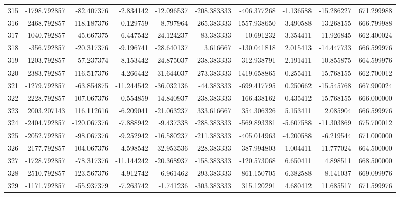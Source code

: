 \begin{tabular}{lrrrrrrrrr}
315 &  -1798.792857 &   -82.407376 &  -2.834142 & -12.096537 &  -208.383333 &  -406.377268 &  -1.136588 & -15.286227 &  671.299988 \\
316 &  -2468.792857 &  -118.187376 &   0.129759 &   8.797964 &  -265.383333 &  1557.938650 &  -3.490588 & -13.268155 &  666.799988 \\
317 &  -1040.792857 &   -45.667375 &  -6.447542 & -24.124237 &   -83.383333 &   -10.691232 &   3.354411 & -11.926845 &  662.400024 \\
318 &   -356.792857 &   -20.317376 &  -9.196741 & -28.640137 &     3.616667 &  -130.041818 &   2.015413 & -14.447733 &  666.599976 \\
319 &  -1203.792857 &   -57.237374 &  -8.153442 & -24.875037 &  -238.383333 &  -312.938791 &   2.191411 & -10.855875 &  664.599976 \\
320 &  -2383.792857 &  -116.517376 &  -4.266442 & -31.644037 &  -273.383333 &  1419.658865 &   0.255411 & -15.768155 &  662.700012 \\
321 &  -1279.792857 &   -63.854875 & -11.244542 & -36.032136 &   -44.383333 &  -699.417795 &   0.250662 & -15.545768 &  667.900024 \\
322 &  -2228.792857 &  -107.067376 &   0.554859 & -14.840937 &  -238.383333 &   166.438162 &   0.435412 & -15.768155 &  666.000000 \\
323 &   2003.207143 &   116.112616 &  -6.209041 & -21.063237 &   333.616667 &   354.306326 &   5.153411 &   2.085904 &  666.599976 \\
324 &  -2404.792857 &  -120.067376 &  -7.888942 &  -9.437338 &  -288.383333 &  -569.893381 &  -5.607588 & -11.303869 &  675.700012 \\
325 &  -2052.792857 &   -98.067376 &  -9.252942 & -16.580237 &  -211.383333 &  -405.014963 &  -4.200588 &  -6.219544 &  671.000000 \\
326 &  -2177.792857 &  -104.067376 &  -4.598542 & -32.953536 &  -228.383333 &   387.994803 &   1.004411 & -11.777024 &  664.500000 \\
327 &  -1728.792857 &   -78.317376 & -11.144242 & -20.368937 &  -158.383333 &  -120.573068 &   6.650411 &   4.898511 &  668.500000 \\
328 &  -2510.792857 &  -123.567376 &  -4.912742 &   6.961462 &  -293.383333 &  -861.150705 &  -6.382588 &  -8.141037 &  669.099976 \\
329 &  -1171.792857 &   -55.937379 &  -7.263742 &  -1.741236 &  -303.383333 &   315.120291 &   4.680412 &  11.685517 &  671.599976 \\

\end{tabular}
